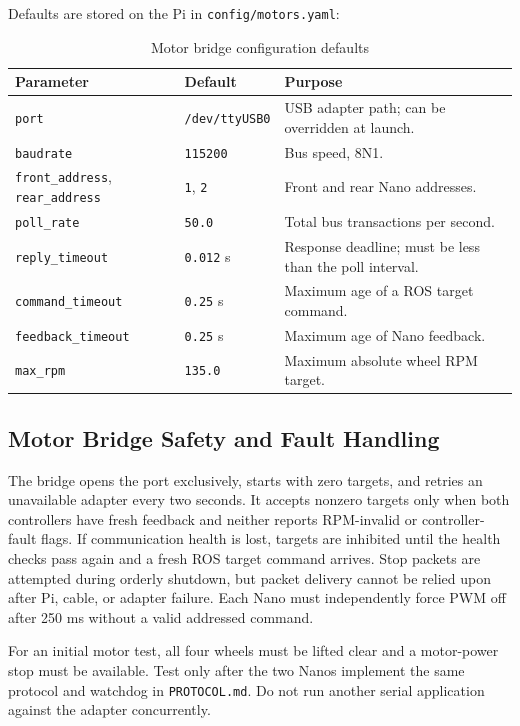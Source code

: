 Defaults are stored on the Pi in \texttt{config/motors.yaml}:
\begin{table}[!htbp]
    \centering
    \small
    \renewcommand{\arraystretch}{1.2}
    \begin{tabular}{p{4.2cm}p{3.1cm}p{7.5cm}}
        \toprule
        \textbf{Parameter} & \textbf{Default} & \textbf{Purpose} \\
        \midrule
        \texttt{port} & \texttt{/dev/ttyUSB0} & USB adapter path; can be overridden at launch. \\
        \texttt{baudrate} & \texttt{115200} & Bus speed, 8N1. \\
        \texttt{front\_address}, \texttt{rear\_address} & \texttt{1}, \texttt{2} & Front and rear Nano addresses. \\
        \texttt{poll\_rate} & \texttt{50.0} & Total bus transactions per second. \\
        \texttt{reply\_timeout} & \texttt{0.012} s & Response deadline; must be less than the poll interval. \\
        \texttt{command\_timeout} & \texttt{0.25} s & Maximum age of a ROS target command. \\
        \texttt{feedback\_timeout} & \texttt{0.25} s & Maximum age of Nano feedback. \\
        \texttt{max\_rpm} & \texttt{135.0} & Maximum absolute wheel RPM target. \\
        \bottomrule
    \end{tabular}
    \caption{Motor bridge configuration defaults}
\end{table}

\subsection{Motor Bridge Safety and Fault Handling}
The bridge opens the port exclusively, starts with zero targets, and retries an unavailable adapter every two seconds. It accepts nonzero targets only when both controllers have fresh feedback and neither reports RPM-invalid or controller-fault flags. If communication health is lost, targets are inhibited until the health checks pass again and a fresh ROS target command arrives. Stop packets are attempted during orderly shutdown, but packet delivery cannot be relied upon after Pi, cable, or adapter failure. Each Nano must independently force PWM off after 250 ms without a valid addressed command.

For an initial motor test, all four wheels must be lifted clear and a motor-power stop must be available. Test only after the two Nanos implement the same protocol and watchdog in \texttt{PROTOCOL.md}. Do not run another serial application against the adapter concurrently.

